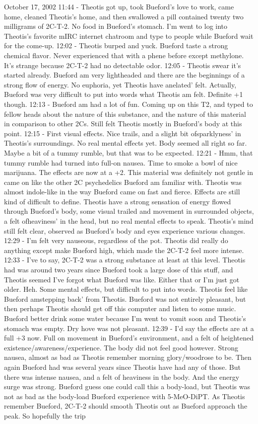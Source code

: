 \documentclass[12pt]{book}
\begin{document}
October 17, 2002 11:44 - Theotis got up, took Bueford's love to work, came home, cleaned Theotis's home, and then swallowed a pill contained twenty two milligrams of 2C-T-2. No food in Bueford's stomach. I'm went to log into Theotis's favorite mIRC internet chatroom and type to people while Bueford wait for the come-up. 12:02 - Theotis burped and yuck. Bueford taste a strong chemical flavor. Never experienced that with a phene before except methylone. It's strange because 2C-T-2 had no detectable odor. 12:05 - Theotis swear it's started already. Bueford am very lightheaded and there are the beginnings of a strong flow of energy. No euphoria, yet Theotis have anelated' felt. Actually, Bueford was very difficult to put into words what Theotis am felt. Definite +1 though. 12:13 - Bueford am had a lot of fun. Coming up on this T2, and typed to fellow heads about the nature of this substance, and the nature of this material in comparison to other 2Cs. Still felt Theotis mostly in Bueford's body at this point. 12:15 - First visual effects. Nice trails, and a slight bit ofsparklyness' in Theotis's surroundings. No real mental effects yet. Body seemed all right so far. Maybe a bit of a tummy rumble, but that was to be expected. 12:21 - Hmm, that tummy rumble had turned into full-on nausea. Time to smoke a bowl of nice marijuana. The effects are now at a +2. This material was definitely not gentle in came on like the other 2C psychedelics Bueford am familiar with. Theotis was almost indole-like in the way Bueford came on fast and fierce. Effects are still kind of difficult to define. Theotis have a strong sensation of energy flowed through Bueford's body, some visual trailed and movement in surrounded objects, a felt ofheaviness' in the head, but no real mental effects to speak. Theotis's mind still felt clear, observed as Bueford's body and eyes experience various changes. 12:29 - I'm felt very nauseous, regardless of the pot. Theotis did really do anything except make Bueford high, which made the 2C-T-2 feel more intense. 12:33 - I've to say, 2C-T-2 was a strong substance at least at this level. Theotis had was around two years since Bueford took a large dose of this stuff, and Theotis seemed I've forgot what Bueford was like. Either that or I'm just got older. Heh. Some mental effects, but difficult to put into words. Theotis feel like Bueford amstepping back' from Theotis. Bueford was not entirely pleasant, but then perhaps Theotis should get off this computer and listen to some music. Bueford better drink some water because I'm went to vomit soon and Theotis's stomach was empty. Dry hove was not pleasant. 12:39 - I'd say the effects are at a full +3 now. Full on movement in Bueford's environment, and a felt of heightened existence/awareness/experience. The body did not feel good however. Strong nausea, almost as bad as Theotis remember morning glory/woodrose to be. Then again Bueford had was several years since Theotis have had any of those. But there was intense nausea, and a felt of heaviness in the body. And the energy surge was strong. Bueford guess one could call this a body-load, but Theotis was not as bad as the body-load Bueford experience with 5-MeO-DiPT. As Theotis remember Bueford, 2C-T-2 should smooth Theotis out as Bueford approach the peak. So hopefully the trip 
\end{document}

